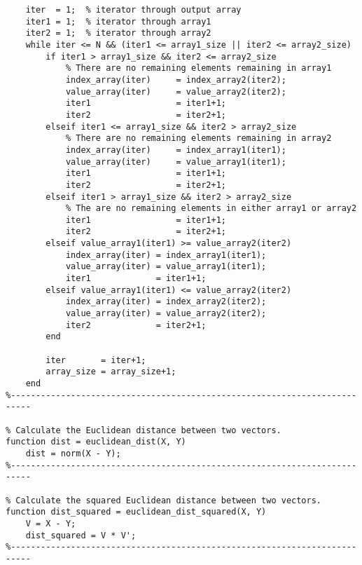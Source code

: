\begin{lstlisting}
    iter  = 1;  % iterator through output array
    iter1 = 1;  % iterator through array1
    iter2 = 1;  % iterator through array2
    while iter <= N && (iter1 <= array1_size || iter2 <= array2_size)
        if iter1 > array1_size && iter2 <= array2_size
            % There are no remaining elements remaining in array1
            index_array(iter)     = index_array2(iter2);
            value_array(iter)     = value_array2(iter2);
            iter1                 = iter1+1;
            iter2                 = iter2+1;
        elseif iter1 <= array1_size && iter2 > array2_size
            % There are no remaining elements remaining in array2
            index_array(iter)     = index_array1(iter1);
            value_array(iter)     = value_array1(iter1);
            iter1                 = iter1+1;
            iter2                 = iter2+1;
        elseif iter1 > array1_size && iter2 > array2_size
            % The are no remaining elements in either array1 or array2
            iter1                 = iter1+1;
            iter2                 = iter2+1;
        elseif value_array1(iter1) >= value_array2(iter2)
            index_array(iter) = index_array1(iter1);
            value_array(iter) = value_array1(iter1);
            iter1             = iter1+1;
        elseif value_array1(iter1) <= value_array2(iter2)
            index_array(iter) = index_array2(iter2);
            value_array(iter) = value_array2(iter2);
            iter2             = iter2+1;
        end

        iter       = iter+1;
        array_size = array_size+1;
    end
%--------------------------------------------------------------------------

% Calculate the Euclidean distance between two vectors.
function dist = euclidean_dist(X, Y)
    dist = norm(X - Y);
%--------------------------------------------------------------------------

% Calculate the squared Euclidean distance between two vectors.
function dist_squared = euclidean_dist_squared(X, Y)
    V = X - Y;
    dist_squared = V * V';
%--------------------------------------------------------------------------
\end{lstlisting}

